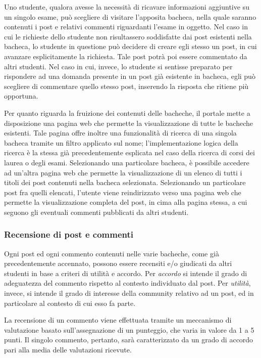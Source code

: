 \documentclass [a4paper,11pt]{book}
\begin{document}
Uno studente, qualora avesse la necessità di ricavare informazioni aggiuntive su un singolo esame, può scegliere di visitare l'apposita bacheca, nella quale saranno contenuti i post e relativi commenti riguardanti l'esame in oggetto. Nel caso in cui le richieste dello studente non risultassero soddisfatte dai post esistenti nella bacheca, lo studente in questione può decidere di creare egli stesso un post, in cui avanzare esplicitamente la richiesta. Tale post potrà poi essere commentato da altri studenti. Nel caso in cui, invece, lo studente si sentisse preparato per rispondere ad una domanda presente in un post già esistente in bacheca, egli può scegliere di commentare quello stesso post, inserendo la risposta che ritiene più opportuna.

\medskip

Per quanto riguarda la fruizione dei contenuti delle bacheche, il portale mette a disposizione una pagina web che permette la visualizzazione di tutte le bacheche esistenti. Tale pagina offre inoltre una funzionalità di ricerca di una singola bacheca tramite un filtro applicato sul nome; l'implementazione logica della ricerca è la stessa già precedentemente esplicata nel caso della ricerca di corsi dei laurea o degli esami. Selezionando una particolare bacheca, è possibile accedere ad un'altra pagina web che permette la visualizzazione di un elenco di tutti i titoli dei post contenuti nella bacheca selezionata. Selezionando un particolare post fra quelli elencati, l'utente viene reindirizzato verso una pagina web che permette la visualizzazione completa del post, in cima alla pagina stessa, a cui seguono gli eventuali commenti pubblicati da altri studenti. 

\medskip

\subsubsection{Recensione di post e commenti}

Ogni post ed ogni commento contenuti nelle varie bacheche, come già precedentemente accennato, possono essere recensiti e/o giudicati da altri studenti in base a criteri di utilità e accordo. Per \emph{accordo} si intende il grado di adeguatezza del commento rispetto al contesto individuato dal post. Per \emph{utilità}, invece, si intende il grado di interesse della community relativo ad un post, ed in particolare al contesto di cui esso fa parte.

La recensione di un commento viene effettuata tramite un meccanismo di valutazione basato sull'assegnazione di un punteggio, che varia in valore da 1 a 5 punti. Il singolo commento, pertanto, sarà caratterizzato da un grado di accordo pari alla media delle valutazioni ricevute.
\end{document}
